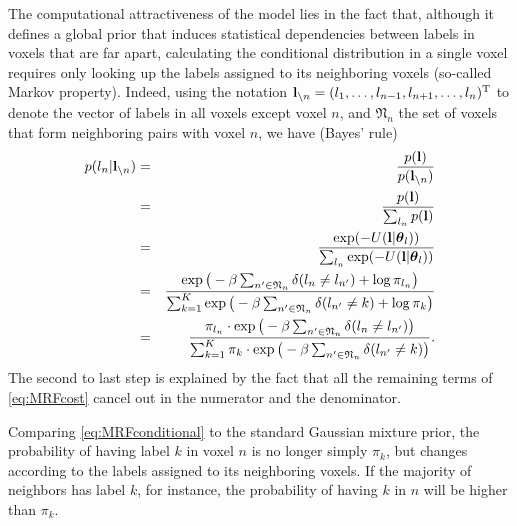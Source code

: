 \documentclass[10pt,twoside]{book}
\begin{document}
The computational attractiveness of the model lies in the fact that, although it defines a global prior that induces statistical dependencies between labels in voxels that are far apart, calculating the conditional distribution in a single voxel requires only looking up the labels assigned to its neighboring voxels (so-called Markov property). Indeed, using the notation $\mathbf{l}_{\setminus n} = ( l_1, \ldots, l_{n-1}, l_{n+1}, \ldots, l_n )^\mathrm{T}$ to denote the vector of labels in all voxels except voxel $n$, and $\mathfrak{N}_n$ the set of voxels that form neighboring pairs with voxel $n$, we have (Bayes' rule)
\begin{eqnarray}
  p( l_n | \fat{l}_{\setminus n} ) & = & \frac{ p( \fat{l} ) }{ p( \fat{l}_{\setminus n} ) } \nonumber\\
                                   & = & \frac{ p( \fat{l} ) }{ \sum_{l_n} p( \fat{l} ) } \nonumber\\
                                   & = & \frac{ \exp( -U(\fat{l} | \bldgr{\theta}_l) ) }{ \sum_{l_n} \exp( -U(\fat{l} | \bldgr{\theta}_l) ) }  \nonumber\\
                                   & = & \frac{ \exp\big( -\beta \sum_{{n'} \in \mathfrak{N}_n} \delta( l_n \neq l_{n'} ) +\log\pi_{l_n} \big) }%
                                              { \sum_{k=1}^K \exp\big( -\beta \sum_{n' \in \mathfrak{N}_n} \delta( l_{n'} \neq k ) +\log\pi_k \big)} \nonumber\\
                                   & = & \frac{ \pi_{l_n} \cdot \exp\big( -\beta \sum_{n' \in \mathfrak{N}_n} \delta( l_n \neq l_{n'} ) \big) }%
                                              { \sum_{k=1}^K \pi_k \cdot \exp\big( -\beta \sum_{n' \in \mathfrak{N}_n} \delta( l_{n'} \neq k ) \big)}.
  \label{eq:MRFconditional}                                
\end{eqnarray}
The second to last step is explained by the fact that all the remaining terms of \eqref{eq:MRFcost} cancel out in the numerator and the denominator.

Comparing \eqref{eq:MRFconditional} to the standard Gaussian mixture prior, the probability of having label $k$ in voxel $n$ is no longer simply $\pi_k$, but changes according to 
the labels assigned to its neighboring voxels.
% 
% 
% 
If the majority of neighbors has label $k$, for instance, the probability of having $k$ in $n$ will be higher than $\pi_k$.
\end{document}
